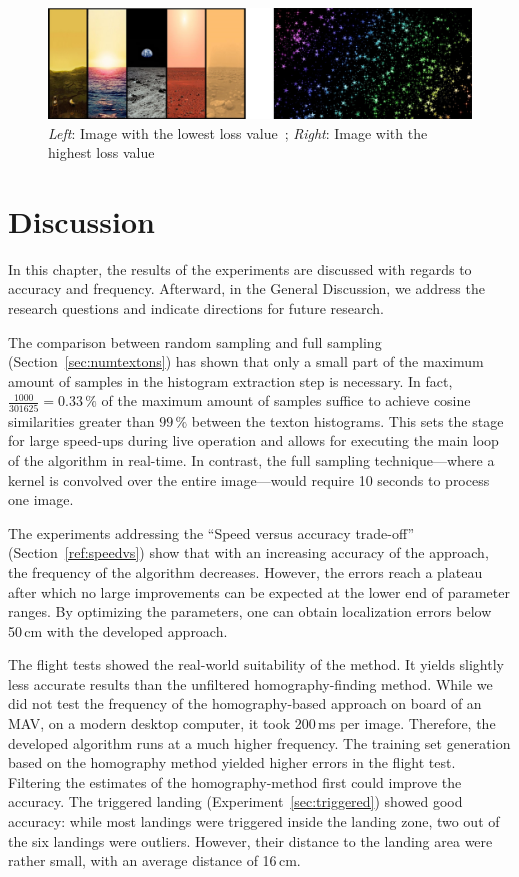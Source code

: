 \documentclass[11pt]{report}
\begin{document}
\begin{figure}[h!]
\begin{center}
\includegraphics[width=0.7\columnwidth]{lowest_highest}
\caption{{\label{fig:minmaximg}
\emph{Left}: Image with the lowest loss value~\cite{earth}; \emph{Right}:
    Image with the highest loss value~\cite{sparkle}%
}}
\end{center}
\end{figure}

\chapter{Discussion}
\label{chap:discussion}

In this chapter, the results of the experiments are discussed with
regards to accuracy and frequency. Afterward, in the General
Discussion, we address the research questions and indicate directions for
future research.

The comparison between random sampling and full sampling
(Section~\ref{sec:numtextons}) has shown that only a small part of the
maximum amount of samples in the histogram extraction step is
necessary. In fact, $\frac{1000}{301625} = 0.33\,\%$ of the maximum
amount of samples suffice to achieve cosine similarities greater than
$99\,\%$ between the texton histograms. This sets the stage for large
speed-ups during live operation and allows for executing the main loop
of the algorithm in real-time.  In contrast, the full sampling
technique---where a kernel is convolved over the entire image---would
require 10 seconds to process one image.

The experiments addressing the ``Speed versus accuracy trade-off''
(Section~\ref{ref:speedvs}) show that with an increasing accuracy of
the approach, the frequency of the algorithm decreases. However, the
errors reach a plateau after which no large improvements can be
expected at the lower end of parameter ranges. By optimizing the
parameters, one can obtain localization errors below 50\,cm with the
developed approach.

The flight tests showed the real-world suitability of the method. It
yields slightly less accurate results than the unfiltered
homography-finding method. While we did not test the frequency of the
homography-based approach on board of an MAV, on a modern desktop
computer, it took 200\,ms per image. Therefore, the developed
algorithm runs at a much higher frequency. The training set
generation based on the homography method yielded higher errors in the
flight test. Filtering the estimates of the homography-method first
could improve the accuracy. The triggered landing
(Experiment~\ref{sec:triggered}) showed good accuracy: while most
landings were triggered inside the landing zone, two out of the six
landings were outliers. However, their distance to the landing area
were rather small, with an average distance of 16\,cm.
\end{document}
